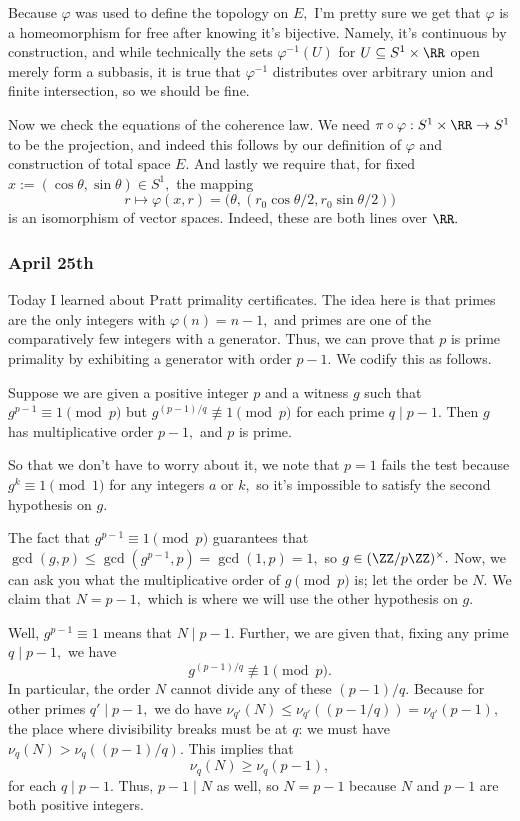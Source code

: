 Because $\varphi$ was used to define the topology on $E,$ I'm pretty sure we get that $\varphi$ is a homeomorphism for free after knowing it's bijective. Namely, it's continuous by construction, and while technically the sets $\varphi^{-1}(U)$ for $U\subseteq S^1\times\RR$ open merely form a subbasis, it is true that $\varphi^{-1}$ distributes over arbitrary union and finite intersection, so we should be fine.

Now we check the equations of the coherence law. We need $\pi\circ\varphi:S^1\times\RR\to S^1$ to be the projection, and indeed this follows by our definition of $\varphi$ and construction of total space $E.$ And lastly we require that, for fixed $x:=(\cos\theta,\sin\theta)\in S^1,$ the mapping
\[r\mapsto\varphi(x,r)=\big(\theta,(r_0\cos\theta/2,r_0\sin\theta/2)\big)\]
is an isomorphism of vector spaces. Indeed, these are both lines over $\RR.$

\subsubsection{April 25th}
Today I learned about Pratt primality certificates. The idea here is that primes are the only integers with $\varphi(n)=n-1,$ and primes are one of the comparatively few integers with a generator. Thus, we can prove that $p$ is prime primality by exhibiting a generator with order $p-1.$ We codify this as follows.
\begin{proposition}
    Suppose we are given a positive integer $p$ and a witness $g$ such that $g^{p-1}\equiv1\pmod p$ but $g^{(p-1)/q}\not\equiv1\pmod p$ for each prime $q\mid p-1.$ Then $g$ has multiplicative order $p-1,$ and $p$ is prime.
\end{proposition}
So that we don't have to worry about it, we note that $p=1$ fails the test because $g^k\equiv1\pmod1$ for any integers $a$ or $k,$ so it's impossible to satisfy the second hypothesis on $g.$

The fact that $g^{p-1}\equiv1\pmod p$ guarantees that $\gcd(g,p)\le\gcd(g^{p-1},p)=\gcd(1,p)=1,$ so $g\in(\ZZ/p\ZZ)^\times.$ Now, we can ask you what the multiplicative order of $g\pmod p$ is; let the order be $N.$ We claim that $N=p-1,$ which is where we will use the other hypothesis on $g.$

Well, $g^{p-1}\equiv1$ means that $N\mid p-1.$ Further, we are given that, fixing any prime $q\mid p-1,$ we have
\[g^{(p-1)/q}\not\equiv1\pmod p.\]
In particular, the order $N$ cannot divide any of these $(p-1)/q.$ Because for other primes $q'\mid p-1,$ we do have $\nu_{q'}(N)\le\nu_{q'}((p-1/q))=\nu_{q'}(p-1),$ the place where divisibility breaks must be at $q$: we must have $\nu_q(N)>\nu_q((p-1)/q).$ This implies that
\[\nu_q(N)\ge\nu_q(p-1),\]
for each $q\mid p-1.$ Thus, $p-1\mid N$ as well, so $N=p-1$ because $N$ and $p-1$ are both positive integers.

